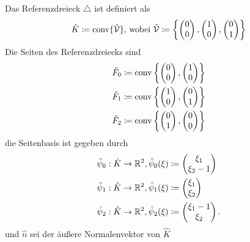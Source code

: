 \begin{Definition}
	
	Das Referenzdreieck $ \triangle $ ist definiert als
	\[ \hat{K} \coloneqq \operatorname{conv} \{ \hat{\mathcal{V}} \} \text{, wobei } \hat{\mathcal{V}} \coloneqq \left\{ 
	\begin{pmatrix}
	0\\
	0
	\end{pmatrix},
	\begin{pmatrix}
	1\\
	0
	\end{pmatrix},
	\begin{pmatrix}
	0\\
	1
	\end{pmatrix} \right\} \]
	Die Seiten des Referenzdreiecks sind
	\begin{align*}
	\hat{F}_0 &\coloneqq \operatorname{conv} \left\{ 
	\begin{pmatrix}
	0\\
	0
	\end{pmatrix},
	\begin{pmatrix}
	1\\
	0
	\end{pmatrix} \right\}\\
	\hat{F}_1 &\coloneqq \operatorname{conv} \left\{ 
	\begin{pmatrix}
	1\\
	0
	\end{pmatrix},
	\begin{pmatrix}
	0\\
	1
	\end{pmatrix} \right\}\\
	\hat{F}_2 &\coloneqq \operatorname{conv} \left\{ 
	\begin{pmatrix}
	0\\
	1
	\end{pmatrix},
	\begin{pmatrix}
	0\\
	0
	\end{pmatrix} \right\}\\ 	
	\end{align*}
	die Seitenbasis ist gegeben durch
	\begin{align*}
	\hat{\psi}_0:\hat{K} \to \mathbb{R}^2, \hat{\psi}_0(\xi) &\coloneqq 
	\begin{pmatrix}
	\xi_1\\
	\xi_2-1
	\end{pmatrix}\\
	\hat{\psi}_1:\hat{K} \to \mathbb{R}^2, \hat{\psi}_1(\xi) &\coloneqq  
	\begin{pmatrix}
	\xi_1\\
	\xi_2
	\end{pmatrix}\\
	\hat{\psi}_2:\hat{K} \to \mathbb{R}^2, \hat{\psi}_2(\xi) &\coloneqq 
	\begin{pmatrix}
	\xi_1-1\\
	\xi_2
	\end{pmatrix}.
	\end{align*}
	und $ \hat{n} $ sei der äußere Normalenvektor von $ \hat{K} $
\end{Definition}

